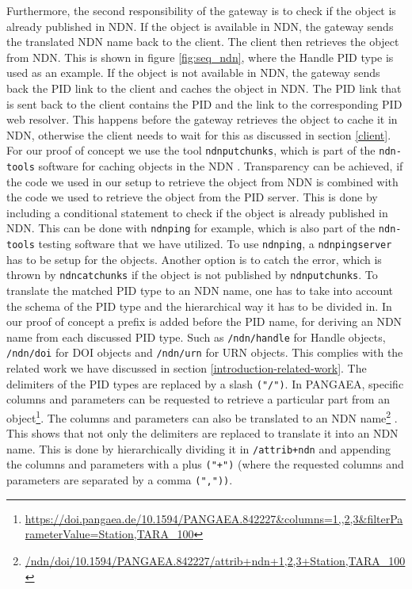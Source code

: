 Furthermore, the second responsibility of the gateway is to check if the object is already published in NDN.
If the object is available in NDN, the gateway sends the translated NDN name back to the client. The client then retrieves the object from NDN. This is shown in figure \ref{fig:seq_ndn}, where the Handle PID type is used as an example. If the object is not available in NDN, the gateway sends back the PID link to the client and caches the object in NDN. 
The PID link that is sent back to the client contains the PID and the link to the corresponding PID web resolver. This happens before the gateway retrieves the object to cache it in NDN, otherwise the client needs to wait for this as discussed in section \ref{client}. For our proof of concept we use the tool \texttt{ndnputchunks}, which is part of the \texttt{ndn-tools} software for caching objects in the NDN \cite{ndn-tools}. Transparency can be achieved, if the code we used in our setup to retrieve the object from NDN is combined with the code we used to retrieve the object from the PID server. This is done by including a conditional statement to check if the object is already published in NDN. This can be done with \texttt{ndnping} for example, which is also part of the \texttt{ndn-tools} testing software that we have utilized. To use \texttt{ndnping}, a \texttt{ndnpingserver} has to be setup for the objects. Another option is to catch the error, which is thrown by \texttt{ndncatchunks} if the object is not published by \texttt{ndnputchunks}. 
To translate the matched PID type to an NDN name, one has to take into account the schema of the PID type and the hierarchical way it has to be divided in. In our proof of concept a prefix is added before the PID name, for deriving an NDN name from each discussed PID type. Such as \texttt{/ndn/handle} for Handle objects, \texttt{/ndn/doi} for DOI objects and \texttt{/ndn/urn} for URN objects. This complies with the related work we have discussed in section \ref{introduction-related-work}. The delimiters of the PID types are replaced by a slash \texttt{("/")}. In PANGAEA, specific columns and parameters can be requested to retrieve a particular part from an object\footnote{\url{https://doi.pangaea.de/10.1594/PANGAEA.842227&columns=1,,2,3&filterParameterValue=Station,TARA_100}}. The columns and parameters can also be translated to an NDN name\footnote{\url{/ndn/doi/10.1594/PANGAEA.842227/attrib+ndn+1,2,3+Station,TARA_100}} \cite{ndn-app-aware}. This shows that not only the delimiters are replaced to translate it into an NDN name. This is done by hierarchically dividing it in \texttt{/attrib+ndn} and appending the columns and parameters with a plus \texttt{("+")} (where the requested columns and parameters are separated by a comma \texttt{(","))}. 
